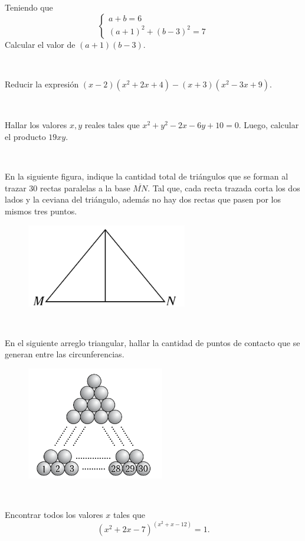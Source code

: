 \begin{exercise}
    Teniendo que
    \[
        \begin{cases}
            a + b = 6\\
            (a + 1)^2 + (b - 3)^2 = 7
        \end{cases}
    \]
    Calcular el valor de $(a + 1)(b - 3)$.
\end{exercise}
\\
\newpage

\begin{exercise}
    Reducir la expresión $(x - 2)(x^2 + 2x + 4) - (x + 3)(x^2 - 3x + 9)$.
\end{exercise}
\\
\vspace{4cm}

\begin{exercise}
    Hallar los valores $x,y$ reales tales que $x^2 + y^2 - 2x - 6y + 10 = 0$.
    Luego, calcular el producto $19xy$.
\end{exercise}
\\
\vspace{5cm}

\begin{exercise}
    En la siguiente figura, indique la cantidad total de triángulos que se forman al trazar 30 rectas paralelas a la base $\overline{MN}$.
    Tal que, cada recta trazada corta los dos lados y la ceviana del triángulo, además no hay dos rectas que pasen por los mismos tres puntos.
    \begin{figure}[H]
        \centering
        \includegraphics[width=7cm]{image/i1}\label{fig:figure2}
    \end{figure}
\end{exercise}
\\
\newpage

\begin{exercise}
    En el siguiente arreglo triangular, hallar la cantidad de puntos de contacto que se generan entre las circunferencias.
    \begin{figure}[H]
        \centering
        \includegraphics[width=6cm]{image/i2}\label{fig:figure3}
    \end{figure}
\end{exercise}
\\
\vspace{6cm}

\begin{exercise}
    Encontrar todos los valores $x$ tales que
    \[
        (x^2 + 2x - 7)^{(x^2 + x - 12)} = 1.
    \]
\end{exercise}